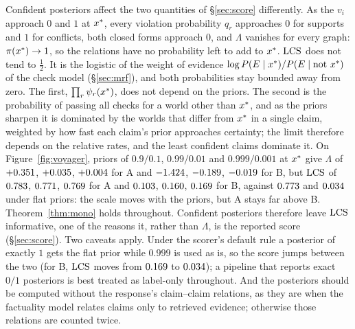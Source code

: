 Confident posteriors affect the two quantities of \S\ref{sec:score} differently. As the $v_i$
approach $0$ and $1$ at $x^{\ast}$, every violation probability $q_r$ approaches $0$ for supports and
$1$ for conflicts, both closed forms approach $0$, and $\Lambda$ vanishes for every graph:
$\pi(x^{\ast})\to1$, so the relations have no probability left to add to $x^{\ast}$. $\mathrm{LCS}$ does not
tend to $\frac12$. It is the logistic of the weight of evidence
$\log P(E\mid x^{\ast})/P(E\mid\text{not }x^{\ast})$ of the check model (\S\ref{sec:mrf}), and both
probabilities stay bounded away from zero. The first, $\prod_r\psi_r(x^{\ast})$, does not depend
on the priors. The second is the probability of passing all checks for a world other than $x^{\ast}$,
and as the priors sharpen it is dominated by the worlds that differ from $x^{\ast}$ in a single claim,
weighted by how fast each claim's prior approaches certainty; the limit therefore depends on the
relative rates, and the least confident claims dominate it.
On Figure~\ref{fig:voyager}, priors of $0.9/0.1$, $0.99/0.01$ and $0.999/0.001$ at $x^{\ast}$ give
$\Lambda$ of $+0.351$, $+0.035$, $+0.004$ for A and $-1.424$, $-0.189$, $-0.019$
for B, but $\mathrm{LCS}$ of $0.783$, $0.771$, $0.769$ for A and $0.103$,
$0.160$, $0.169$ for B, against $0.773$ and $0.034$ under flat priors: the scale
moves with the priors, but A stays far above B.
Theorem~\ref{thm:mono} holds throughout. Confident posteriors therefore leave $\mathrm{LCS}$ informative,
one of the reasons it, rather than $\Lambda$, is the reported score (\S\ref{sec:score}). Two caveats apply. Under the
scorer's default rule a posterior of exactly $1$ gets the flat prior while $0.999$ is used as is,
so the score jumps between the two (for B, $\mathrm{LCS}$ moves from $0.169$ to $0.034$); a
pipeline that reports exact $0/1$ posteriors is best treated as label-only throughout. And the posteriors
should be computed without the response's claim--claim relations, as they are when the factuality
model relates claims only to retrieved evidence; otherwise those relations are counted twice.

